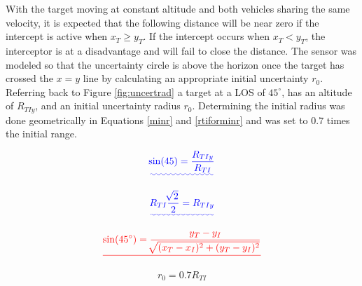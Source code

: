 \documentclass[conference]{IEEEtran}
\providecommand{\DIFadd}[1]{{\protect\color{blue}\uwave{#1}}} %
\providecommand{\DIFdel}[1]{{\protect\color{red}\sout{#1}}}                      %
\providecommand{\DIFaddbegin}{} %
\providecommand{\DIFaddend}{} %
\providecommand{\DIFdelbegin}{} %
\providecommand{\DIFdelend}{} %
\newcommand{\DIFscaledelfig}{0.5}
\newlength{\DIFdelgraphicswidth} %
\newlength{\DIFdelgraphicsheight} %
\newcommand{\DIFaddincludegraphics}[2][]{{\color{blue}\fbox{\DIFOincludegraphics[#1]{#2}}}} %
\newcommand{\DIFdelincludegraphics}[2][]{%
\sbox{\DIFdelgraphicsbox}{\DIFOincludegraphics[#1]{#2}}%
\settoboxwidth{\DIFdelgraphicswidth}{\DIFdelgraphicsbox} %
\settoboxtotalheight{\DIFdelgraphicsheight}{\DIFdelgraphicsbox} %
\scalebox{\DIFscaledelfig}{%
\parbox[b]{\DIFdelgraphicswidth}{\usebox{\DIFdelgraphicsbox}\\[-\baselineskip] \rule{\DIFdelgraphicswidth}{0em}}\llap{\resizebox{\DIFdelgraphicswidth}{\DIFdelgraphicsheight}{%
\setlength{\unitlength}{\DIFdelgraphicswidth}%
\begin{picture}(1,1)%
\thicklines\linethickness{2pt} %
{\color[rgb]{1,0,0}\put(0,0){\framebox(1,1){}}}%
{\color[rgb]{1,0,0}\put(0,0){\line( 1,1){1}}}%
{\color[rgb]{1,0,0}\put(0,1){\line(1,-1){1}}}%
\end{picture}%
}\hspace*{3pt}}} %
} %
\DeclareRobustCommand{\DIFaddbegin}{\DIFOaddbegin \let\includegraphics\DIFaddincludegraphics} %
\DeclareRobustCommand{\DIFaddend}{\DIFOaddend \let\includegraphics\DIFOincludegraphics} %
\DeclareRobustCommand{\DIFdelbegin}{\DIFOdelbegin \let\includegraphics\DIFdelincludegraphics} %
\DeclareRobustCommand{\DIFdelend}{\DIFOaddend \let\includegraphics\DIFOincludegraphics} %
\begin{document}
With the target moving at constant altitude and both vehicles sharing the same velocity, it is expected that the following distance will be near zero if the intercept is active when $x_T \geq y_T$. If the intercept occurs when $x_T<y_T$, the interceptor is at a disadvantage and will fail to close the distance. The sensor was modeled so that the uncertainty circle is above the horizon once the target has crossed the $x=y$ line by calculating an appropriate initial uncertainty $r_0$. Referring back to Figure \ref{fig:uncertrad} a target \DIFaddbegin \DIFadd{is detected }\DIFaddend at a LOS of $45^{\circ}$, has an altitude of $R_{TIy}$, and an initial uncertainty radius $r_0$. Determining the initial radius was done geometrically in Equations \ref{minr} and \ref{rtiforminr} and was set to $0.7$ times the initial range.

\DIFaddbegin \begin{equation} \DIFadd{\label{minr}
\sin(45) = \frac{R_{TIy}}{R_{TI}}
}\end{equation}
\DIFaddend 

\DIFaddbegin \begin{equation} \DIFadd{\label{rtiforminr}
R_{TI}\frac{\sqrt[]{2}}{2} = R_{TIy}
}\end{equation}
\DIFaddend 

\DIFdelbegin \begin{displaymath} \DIFdel{%
\sin(45^\circ) = \frac{y_T - y_I}{\sqrt[]{(x_T - x_I)^2+(y_T - y_I)^2}}
}\end{displaymath}



\DIFdelend \begin{equation} \label{initialr}
r_0 = 0.7R_{TI}
\end{equation}
\end{document}

